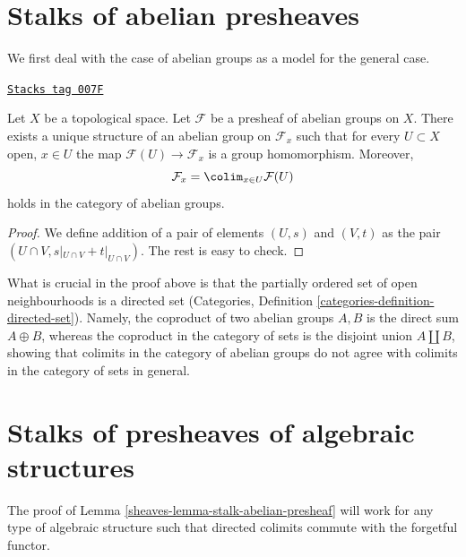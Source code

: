 \section{Stalks of abelian presheaves}
\label{sheaves-section-stalks-abelian-presheaves}
We first deal with the case of abelian groups as
a model for the general case.

\begin{lemma}
\label{sheaves-lemma-stalk-abelian-presheaf}
\href{https://stacks.math.columbia.edu/tag/007F}{\texttt{Stacks tag 007F}}

Let $X$ be a topological space. Let $\mathcal{F}$ be a presheaf
of abelian groups on $X$. There exists a unique structure of an
abelian group on $\mathcal{F}_x$ such that for every
$U \subset X$ open, $x\in U$ the map $\mathcal{F}(U) \to \mathcal{F}_x$
is a group homomorphism. Moreover,
$$
\mathcal{F}_x
=
\colim_{x\in U} \mathcal{F}(U)
$$
holds in the category of abelian groups.
\end{lemma}

\begin{proof}
We define addition of a pair of elements
$(U, s)$ and $(V, t)$ as the pair $(U \cap V, s|_{U\cap V} +
t|_{U \cap V})$. The rest is easy to check.
\end{proof}

What is crucial in the proof above is that the partially ordered set of open
neighbourhoods is a directed set (Categories, Definition
\ref{categories-definition-directed-set}). Namely, the coproduct
of two abelian groups $A, B$ is the direct sum $A \oplus B$, whereas
the coproduct in the category of sets is the disjoint
union $A \amalg B$, showing that colimits in the category
of abelian groups do not agree with colimits in the
category of sets in general.

\section{Stalks of presheaves of algebraic structures}
\label{sheaves-section-stalks-presheaves-structures}
The proof of Lemma \ref{sheaves-lemma-stalk-abelian-presheaf} will work
for any type of algebraic structure such that directed
colimits commute with the forgetful functor.

